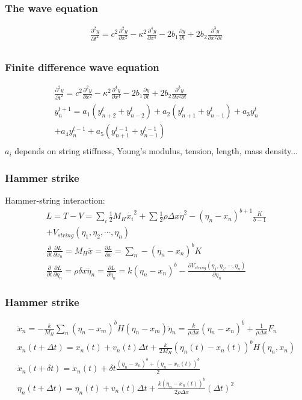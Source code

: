 \documentclass{beamer}
\begin{document}
\begin{frame}\frametitle{The wave equation}
	\begin{gather*}
	\frac{\partial^2 y}{\partial t^2} = c^2\frac{\partial^2 y}{\partial x^2}-\kappa^2\frac{\partial^4y}{\partial x^4}-2b_1\frac{\partial y}{\partial t} + 2b_2 \frac{\partial^3y}{\partial x^2\partial t}\\
\end{gather*}
\end{frame}

\begin{frame}\frametitle{Finite difference wave equation}
	\begin{gather*}
	\frac{\partial^2 y}{\partial t^2} = c^2\frac{\partial^2 y}{\partial x^2}-\kappa^2\frac{\partial^4y}{\partial x^4}-2b_1\frac{\partial y}{\partial t} + 2b_2 \frac{\partial^3y}{\partial x^2\partial t}\\
y_n^{t+1} = a_1\left(y_{n+2}^t+y_{n-2}^t\right)+a_2\left(y_{n+1}^t+y_{n-1}^t\right)+a_3y_n^t\\
+a_4y_n^{t-1}+a_5\left(y_{n+1}^{t-1}+y_{n-1}^{t-1}\right)\\
\end{gather*}
$a_i$ depends on string stiffness, Young's modulus, tension, length, mass density...
\end{frame}


\begin{frame}\frametitle{Hammer strike}
Hammer-string interaction:\\

\begin{gather*}
L = T - V = \sum_i \frac{1}{2}M_H\dot{x_i}^2+\sum\frac{1}{2}\rho \Delta x \dot{\eta}^2-(\eta_n-x_n)^{b+1}\frac{K}{b-1}\\+V_{string}\left(\eta_1,\eta_2,\cdots, \eta_n\right)\\
\frac{\partial}{\partial t}\frac{\partial L}{\partial \dot{x}_n} = M_H\ddot{x} = \frac{\partial L}{\partial x} = \sum_n-\left(\eta_n-x_ n\right)^bK\\
\frac{\partial}{\partial t}\frac{\partial L}{\partial \dot{\eta}_n} = \rho \delta x \ddot{\eta}_n = \frac{\partial L}{\partial \dot{\eta}_n} = k(\eta_n-x_n)^b - \frac{\partial V_{string}\left(\eta_1,\eta_2,\cdots, \eta_n\right)}{\partial \eta_n}
\end{gather*}
\end{frame}

\begin{frame}\frametitle{Hammer strike}
\begin{gather*}
\ddot{x}_n = -\frac{k}{M_H}\sum_n (\eta_n-x_m)^bH(\eta_n-x_m)\ddot{\eta}_n = \frac{k}{\rho\Delta x}\left(\eta_n-x_n\right)^b+\frac{1}{\rho\Delta x}F_n\\
x_n(t+\Delta t) = x_n(t) + v_n(t)\Delta t + \frac{k}{2M_H}\left(\eta_n(t)-x_n(t)\right)^bH(\eta_n,x_n)\\
\dot{x}_n(t+\delta t) = \dot{x}_n(t) + \delta t \frac{\left(\eta_n-x_n\right)^b+\left(\eta_n-x_n(t)\right)^b}{2}\\
\eta_n(t+\Delta t) = \eta_n(t) + v_n(t)\Delta t + \frac{k\left(\eta_n-x_n(t)\right)^b}{2\rho \Delta x}\left(\Delta t\right)^2
\end{gather*}
\end{frame}
\end{document}
